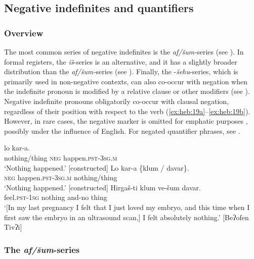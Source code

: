 \documentclass[output=paper,colorlinks,citecolor=brown]{langscibook}
\begin{document}
\subsection{Negative indefinites and quantifiers} \label{sec:heb:3.2}
\subsubsection{Overview}
The most common series of negative indefinites is the \textit{af/šum-}series (see ). In formal registers, the \textit{iš}{}-series is an alternative, and it has a slightly broader distribution than the \textit{af/šum-}series (see ). Finally, the {}-\textit{šehu}{}-series, which is primarily used in non-negative contexts, can also co-occur with negation when the indefinite pronoun is modified by a relative clause or other modifiers (see ). 
Negative indefinite pronouns obligatorily co-occur with clausal negation, regardless of their position with respect to the verb (\ref{ex:heb:19a}--\ref{ex:heb:19b}). However, in rare cases, the negative marker is omitted for emphatic purposes , possibly under the influence of English.
For negated quantifier phrases, see .

\ea\label{ex:heb:19}
    \ea\label{ex:heb:19a}
         lo kar-a.\\
            nothing/thing \textsc{neg} happen.\textsc{pst-3sg.m}\\
        \glt ‘Nothing happened.’ [constructed]
    \ex\label{ex:heb:19b}
        \gll Lo kar-a {\{klum / davar\}}.\\
            \textsc{neg} happen.\textsc{pst-3sg.m} nothing/thing\\
        \glt ‘Nothing happened.’ [constructed]
    \ex\label{ex:heb:19c}
        \gll Hirgaš-ti klum ve-šum davar.\\
            feel.\textsc{pst-1sg} nothing and{}-no thing\\
        \glt ‘[In my last pregnancy I felt that I just loved my embryo, and this time when I first saw the embryo in an ultrasound scan,] I felt absolutely nothing.’ [Beʔofen Tivʔi]
    \z 
\z 

\subsubsection{The \textit{af/šum}{}-series} \label{sec:heb:3.2.1}
\end{document}
